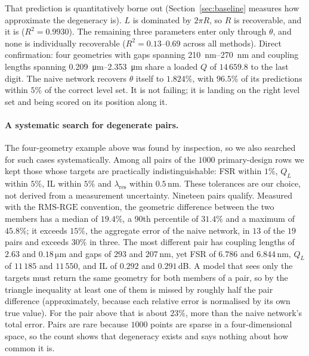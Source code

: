 \documentclass[11pt]{article}
\newcommand{\lres}{\lambda_{\mathrm{res}}}
\newcommand{\QL}{Q_L}
\newcommand{\rge}{\mathrm{RMS\text{-}RGE}}
\begin{document}
That prediction is quantitatively borne out (Section~\ref{sec:baseline} measures how approximate the degeneracy is). $L$ is dominated by $2\pi R$, so
$R$ is recoverable, and it is ($R^2 = 0.9930$). The remaining three parameters
enter only through $\theta$, and none is individually recoverable
($R^2 = 0.13$--$0.69$ across all methods). Direct confirmation: four
geometries with gaps spanning \SIrange{210}{270}{nm} and coupling lengths
spanning \SIrange{0.209}{2.353}{\micro\metre} share a loaded $Q$ of
$14\,659.8$ to the last digit. The naive network recovers $\theta$ itself to
$1.824\%$, with $96.5\%$ of its predictions within $5\%$ of the correct level
set. It is not failing; it is landing on the right level set and being scored
on its position along it.

\paragraph{A systematic search for degenerate pairs.} The four-geometry example above was found by inspection, so we also searched for such cases systematically. Among all pairs of the $1000$ primary-design rows we kept those whose targets are practically indistinguishable: FSR within $1\%$, $\QL$ within $5\%$, IL within $5\%$ and $\lres$ within $0.5$\,nm. These tolerances are our choice, not derived from a measurement uncertainty. Nineteen pairs qualify. Measured with the $\rge$ convention, the geometric difference between the two members has a median of $19.4\%$, a 90th percentile of $31.4\%$ and a maximum of $45.8\%$; it exceeds $15\%$, the aggregate error of the naive network, in $13$ of the $19$ pairs and exceeds $30\%$ in three. The most different pair has coupling lengths of $2.63$ and $0.18\,\si{\micro\metre}$ and gaps of $293$ and $207$\,nm, yet FSR of $6.786$ and $6.844$\,nm, $\QL$ of $11\,185$ and $11\,550$, and IL of $0.292$ and $0.291$\,dB. A model that sees only the targets must return the same geometry for both members of a pair, so by the triangle inequality at least one of them is missed by roughly half the pair difference (approximately, because each relative error is normalised by its own true value). For the pair above that is about $23\%$, more than the naive network's total error. Pairs are rare because $1000$ points are sparse in a four-dimensional space, so the count shows that degeneracy exists and says nothing about how common it is.
\end{document}
